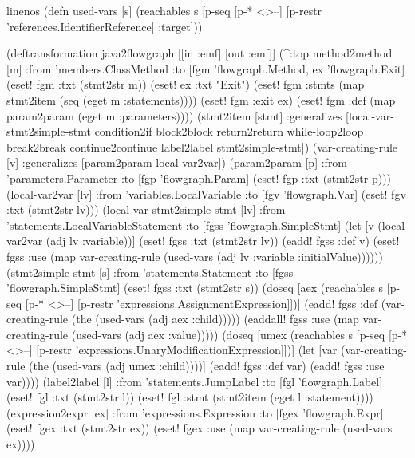 \documentclass[submission]{eptcs}
\begin{document}
\begin{clojurecode*}{linenos}
(defn used-vars [s]
  (reachables s [p-seq [p-* <>--]
                 [p-restr 'references.IdentifierReference]
                 :target]))

(deftransformation java2flowgraph [[in :emf] [out :emf]]
  (^:top method2method [m]
      :from 'members.ClassMethod
      :to [fgm 'flowgraph.Method, ex 'flowgraph.Exit]
      (eset! fgm :txt (stmt2str m))
      (eset! ex :txt "Exit")
      (eset! fgm :stmts (map stmt2item (seq (eget m :statements))))
      (eset! fgm :exit ex)
      (eset! fgm :def (map param2param (eget m :parameters))))
  (stmt2item [stmt]
      :generalizes [local-var-stmt2simple-stmt condition2if block2block
                    return2return while-loop2loop break2break continue2continue
                    label2label stmt2simple-stmt])
  (var-creating-rule [v]
      :generalizes [param2param local-var2var])
  (param2param [p]
      :from 'parameters.Parameter
      :to [fgp 'flowgraph.Param]
      (eset! fgp :txt (stmt2str p)))
  (local-var2var [lv]
      :from 'variables.LocalVariable
      :to [fgv 'flowgraph.Var]
      (eset! fgv :txt (stmt2str lv)))
  (local-var-stmt2simple-stmt [lv]
      :from 'statements.LocalVariableStatement
      :to [fgss 'flowgraph.SimpleStmt]
      (let [v (local-var2var (adj lv :variable))]
        (eset! fgss :txt (stmt2str lv))
        (eadd! fgss :def v)
        (eset! fgss :use (map var-creating-rule
                              (used-vars (adj lv :variable :initialValue))))))
  (stmt2simple-stmt [s]
      :from 'statements.Statement
      :to [fgss 'flowgraph.SimpleStmt]
      (eset! fgss :txt (stmt2str s))
      (doseq [aex  (reachables s [p-seq [p-* <>--]
                                  [p-restr 'expressions.AssignmentExpression]])]
        (eadd! fgss :def (var-creating-rule (the (used-vars (adj aex :child)))))
        (eaddall! fgss :use (map var-creating-rule (used-vars (adj aex :value)))))
      (doseq [umex (reachables s [p-seq [p-* <>--]
                                  [p-restr 'expressions.UnaryModificationExpression]])]
        (let [var (var-creating-rule (the (used-vars (adj umex :child))))]
          (eadd! fgss :def var)
          (eadd! fgss :use var))))
  (label2label [l]
      :from 'statements.JumpLabel
      :to [fgl 'flowgraph.Label]
      (eset! fgl :txt (stmt2str l))
      (eset! fgl :stmt (stmt2item (eget l :statement))))
  (expression2expr [ex]
      :from 'expressions.Expression
      :to [fgex 'flowgraph.Expr]
      (eset! fgex :txt (stmt2str ex))
      (eset! fgex :use (map var-creating-rule (used-vars ex))))

\end{clojurecode*}
\end{document}
